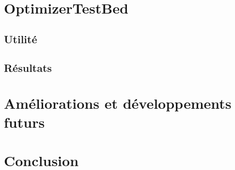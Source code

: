 \documentclass[a4paper, 11pt]{article}
\begin{document}
\section{OptimizerTestBed}

\subsection{Utilité}

\subsection{Résultats}

\section{Améliorations et développements futurs}

\section{Conclusion}

\newpage
\nocite{*}


\end{document}
